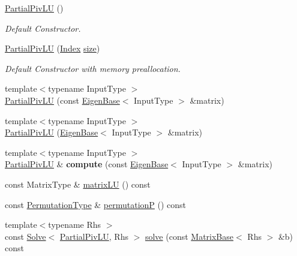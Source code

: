 \begin{DoxyCompactItemize}
\item 
\hyperlink{group___l_u___module_a10cba8cef72c8fbbc0dfef98e4e62739}{Partial\+Piv\+LU} ()
\begin{DoxyCompactList}\small\item\em Default Constructor. \end{DoxyCompactList}\item 
\hyperlink{group___l_u___module_a3f99c158bd6769f06a000229dc274179}{Partial\+Piv\+LU} (\hyperlink{group___core___module_a554f30542cc2316add4b1ea0a492ff02}{Index} \hyperlink{group___core___module_ac2c9348df3bb9c0044dbae6c278a8977}{size})
\begin{DoxyCompactList}\small\item\em Default Constructor with memory preallocation. \end{DoxyCompactList}\item 
{\footnotesize template$<$typename Input\+Type $>$ }\\\hyperlink{group___l_u___module_a66a51f5fe47553d13ac92dc2374c3420}{Partial\+Piv\+LU} (const \hyperlink{group___core___module_struct_eigen_1_1_eigen_base}{Eigen\+Base}$<$ Input\+Type $>$ \&matrix)
\item 
{\footnotesize template$<$typename Input\+Type $>$ }\\\hyperlink{group___l_u___module_a8496e71c5cc03948c06aff2fa9e21e40}{Partial\+Piv\+LU} (\hyperlink{group___core___module_struct_eigen_1_1_eigen_base}{Eigen\+Base}$<$ Input\+Type $>$ \&matrix)
\item 
\mbox{\label{group___l_u___module_a6236eb61ae6886543c407582f4ca1550}} 
{\footnotesize template$<$typename Input\+Type $>$ }\\\hyperlink{group___l_u___module_class_eigen_1_1_partial_piv_l_u}{Partial\+Piv\+LU} \& {\bfseries compute} (const \hyperlink{group___core___module_struct_eigen_1_1_eigen_base}{Eigen\+Base}$<$ Input\+Type $>$ \&matrix)
\item 
const Matrix\+Type \& \hyperlink{group___l_u___module_abea0d7e51c5591a6db152eade0892d9c}{matrix\+LU} () const
\item 
const \hyperlink{group___core___module}{Permutation\+Type} \& \hyperlink{group___l_u___module_a1c637530b3215787668a75ebb2e7b882}{permutationP} () const
\item 
{\footnotesize template$<$typename Rhs $>$ }\\const \hyperlink{group___core___module_class_eigen_1_1_solve}{Solve}$<$ \hyperlink{group___l_u___module_class_eigen_1_1_partial_piv_l_u}{Partial\+Piv\+LU}, Rhs $>$ \hyperlink{group___l_u___module_a49247bd2f742a46bca1f9c2bf1b19ad8}{solve} (const \hyperlink{group___core___module_class_eigen_1_1_matrix_base}{Matrix\+Base}$<$ Rhs $>$ \&b) const

\end{DoxyCompactItemize}
